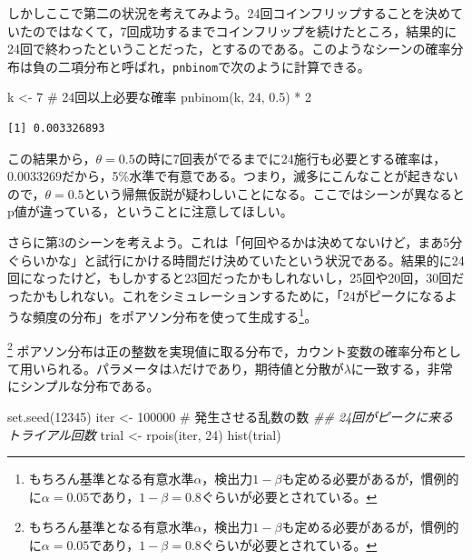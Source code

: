 \documentclass[
  a4paper,
]{ltjsbook}
\newenvironment{Shaded}{\begin{snugshade}}{\end{snugshade}}
\newcommand{\CommentTok}[1]{\textcolor[rgb]{0.37,0.37,0.37}{#1}}
\newcommand{\DecValTok}[1]{\textcolor[rgb]{0.68,0.00,0.00}{#1}}
\newcommand{\DocumentationTok}[1]{\textcolor[rgb]{0.37,0.37,0.37}{\textit{#1}}}
\newcommand{\FloatTok}[1]{\textcolor[rgb]{0.68,0.00,0.00}{#1}}
\newcommand{\FunctionTok}[1]{\textcolor[rgb]{0.28,0.35,0.67}{#1}}
\newcommand{\NormalTok}[1]{\textcolor[rgb]{0.00,0.23,0.31}{#1}}
\newcommand{\OtherTok}[1]{\textcolor[rgb]{0.00,0.23,0.31}{#1}}
\newcommand{\SpecialCharTok}[1]{\textcolor[rgb]{0.37,0.37,0.37}{#1}}
\begin{document}
しかしここで第二の状況を考えてみよう。24回コインフリップすることを決めていたのではなくて，7回成功するまでコインフリップを続けたところ，結果的に24回で終わったということだった，とするのである。このようなシーンの確率分布は負の二項分布と呼ばれ，\texttt{pnbinom}で次のように計算できる。

\begin{Shaded}
\begin{Highlighting}[]
\NormalTok{k }\OtherTok{\textless{}{-}} \DecValTok{7}
\CommentTok{\# 24回以上必要な確率}
\FunctionTok{pnbinom}\NormalTok{(k, }\DecValTok{24}\NormalTok{, }\FloatTok{0.5}\NormalTok{) }\SpecialCharTok{*} \DecValTok{2}
\end{Highlighting}
\end{Shaded}

\begin{verbatim}
[1] 0.003326893
\end{verbatim}

この結果から，\(\theta=0.5\)の時に7回表がでるまでに24施行も必要とする確率は，0.0033269だから，5\%水準で有意である。つまり，滅多にこんなことが起きないので，\(\theta=0.5\)という帰無仮説が疑わしいことになる。ここではシーンが異なるとp値が違っている，ということに注意してほしい。

さらに第3のシーンを考えよう。これは「何回やるかは決めてないけど，まあ5分ぐらいかな」と試行にかける時間だけ決めていたという状況である。結果的に24回になったけど，もしかすると23回だったかもしれないし，25回や20回，30回だったかもしれない。これをシミュレーションするために，「24がピークになるような頻度の分布」をポアソン分布を使って生成する\footnote{もちろん基準となる有意水準\(\alpha\)，検出力\(1-\beta\)も定める必要があるが，慣例的に\(\alpha = 0.05\)であり，\(1-\beta =0.8\)ぐらいが必要とされている。}。

\footnote{もちろん基準となる有意水準\(\alpha\)，検出力\(1-\beta\)も定める必要があるが，慣例的に\(\alpha = 0.05\)であり，\(1-\beta =0.8\)ぐらいが必要とされている。}
ポアソン分布は正の整数を実現値に取る分布で，カウント変数の確率分布として用いられる。パラメータは\(\lambda\)だけであり，期待値と分散が\(\lambda\)に一致する，非常にシンプルな分布である。

\begin{Shaded}
\begin{Highlighting}[]
\FunctionTok{set.seed}\NormalTok{(}\DecValTok{12345}\NormalTok{)}
\NormalTok{iter }\OtherTok{\textless{}{-}} \DecValTok{100000} \CommentTok{\# 発生させる乱数の数}
\DocumentationTok{\#\# 24回がピークに来るトライアル回数}
\NormalTok{trial }\OtherTok{\textless{}{-}} \FunctionTok{rpois}\NormalTok{(iter, }\DecValTok{24}\NormalTok{)}
\FunctionTok{hist}\NormalTok{(trial)}
\end{Highlighting}
\end{Shaded}
\end{document}

